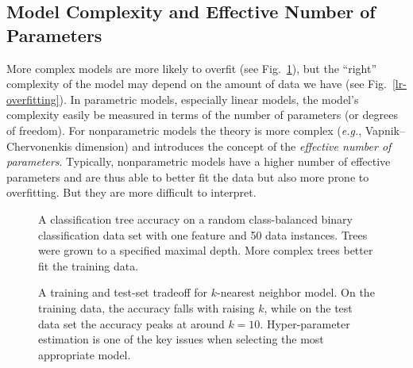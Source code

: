 \begin{refsection}
\subsection*{Model Complexity and Effective Number of Parameters}

More complex models are more likely to overfit (see Fig.~\ref{fig:tree-depth-overfit}), but the ``right'' complexity of the model may depend on the amount of data we have (see Fig.~\ref{lr-overfitting}). In parametric models, especially linear models, the model's complexity easily be measured in terms of the number of parameters (or degrees of freedom). For nonparametric models the theory is more complex ({\em e.g.}, Vapnik–Chervonenkis dimension) and introduces the concept of the {\em effective number of parameters}. Typically, nonparametric models have a higher number of effective parameters and are thus able to better fit the data but also more prone to overfitting. But they are more difficult to interpret.

\begin{figure}[htbp]
\label{fig:tree-depth-overfit}
\caption{A classification tree accuracy on a random class-balanced binary classification data set with one feature and 50 data instances. Trees were grown to a specified maximal depth. More complex trees better fit the training data.}
\end{figure}

\begin{figure}[htbp]
\label{fig:heatmaps-overfitting}
\caption{A training and test-set tradeoff for $k$-nearest neighbor model. On the training data, the accuracy falls with raising $k$, while on the test data set the accuracy peaks at around $k=10$. Hyper-parameter estimation is one of the key issues when selecting the most appropriate model.}
\end{figure}



\end{refsection}
